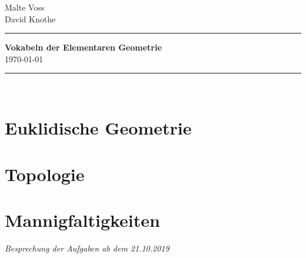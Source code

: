 \documentclass[a4paper,11pt]{article} %
\begin{document}
%
\hfill \parbox{24mm}
{ 
Malte Voss\\
David Knothe\\
}

\rule{\textwidth}{1pt}                                   %
%
\begin{center}
\textbf{
Vokabeln der Elementaren Geometrie \\[1ex] %
}
{
%
%
\today
}
\end{center}
% 
\rule{\textwidth}{1pt}\\                                 %
\section{Euklidische Geometrie} 

\vspace{3ex}
\section{Topologie}

\vspace{3ex}
\section{Mannigfaltigkeiten}




\vspace*{\fill} %

\begin{flushright}
\textit{ Besprechung der Aufgaben ab dem 21.10.2019 }
\end{flushright}
\end{document}
